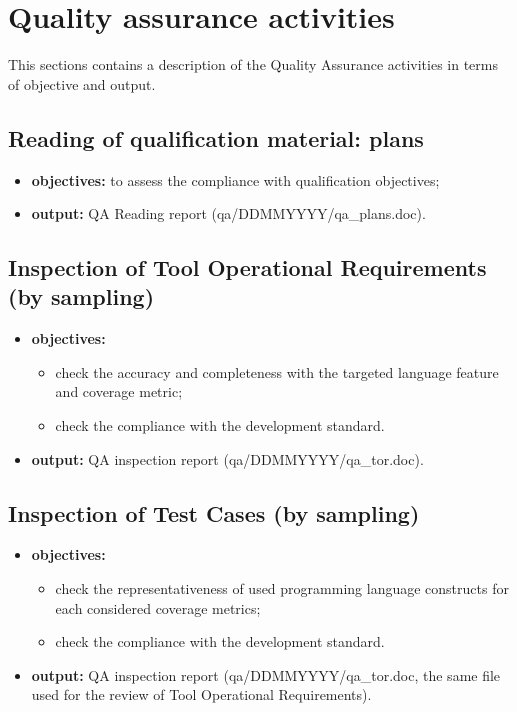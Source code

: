 \documentclass {report}
\begin{document}
\chapter{Quality assurance activities}
This sections contains a description of the Quality Assurance activities in terms of objective and output.

\section{Reading of \xcov qualification material: plans}
\begin{itemize}
\item \textbf{objectives:} to assess the compliance with qualification objectives;
\item \textbf{output:} QA Reading report (qa/DDMMYYYY/qa\_plans.doc).
\end{itemize}

\section{Inspection of Tool Operational Requirements (by sampling)}
\begin{itemize}
\item \textbf{objectives:}
\begin{itemize}
\item check the accuracy and completeness with the targeted language feature and coverage metric;
\item check the compliance with the development standard.
\end{itemize}
\item \textbf{output:} QA inspection report (qa/DDMMYYYY/qa\_tor.doc).
\end{itemize}

\section{Inspection of Test Cases (by sampling)}
\begin{itemize}
\item \textbf{objectives:}
\begin{itemize}
\item check the representativeness of used programming language constructs for each considered coverage metrics;
\item check the compliance with the development standard.
\end{itemize}
\item \textbf{output:} QA inspection report (qa/DDMMYYYY/qa\_tor.doc, the same file used for the review of Tool Operational Requirements).
\end{itemize}
\end{document}
